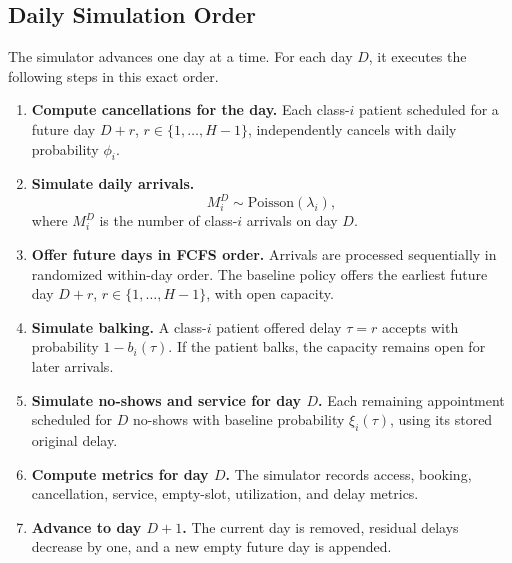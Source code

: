 \documentclass[11pt]{article}
\begin{document}
\subsection{Daily Simulation Order}

The simulator advances one day at a time. For each day \(D\), it executes the following steps in
this exact order.

\begin{enumerate}[itemsep=0.35em]
    \item \textbf{Compute cancellations for the day.} Each class-\(i\) patient scheduled for a future day \(D+r\), \(r\in\{1,\dots,H-1\}\), independently cancels with daily probability \(\phi_i\).
    \item \textbf{Simulate daily arrivals.}
    \[
    M_i^D\sim\mathrm{Poisson}(\lambda_i),
    \]
    where \(M_i^D\) is the number of class-\(i\) arrivals on day \(D\).
    \item \textbf{Offer future days in FCFS order.} Arrivals are processed sequentially in randomized within-day order. The baseline policy offers the earliest future day \(D+r\), \(r\in\{1,\dots,H-1\}\), with open capacity.
    \item \textbf{Simulate balking.} A class-\(i\) patient offered delay \(\tau=r\) accepts with probability \(1-b_i(\tau)\). If the patient balks, the capacity remains open for later arrivals.
    \item \textbf{Simulate no-shows and service for day \(D\).} Each remaining appointment scheduled for \(D\) no-shows with baseline probability \(\xi_i(\tau)\), using its stored original delay.
    \item \textbf{Compute metrics for day \(D\).} The simulator records access, booking, cancellation, service, empty-slot, utilization, and delay metrics.
    \item \textbf{Advance to day \(D+1\).} The current day is removed, residual delays decrease by one, and a new empty future day is appended.
\end{enumerate}
\end{document}
